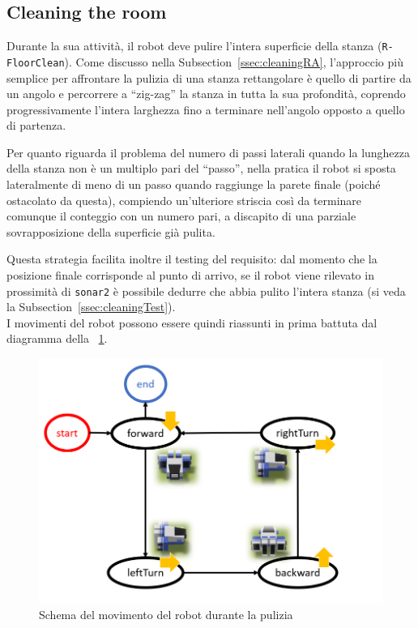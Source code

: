 \documentclass{../llncs}
\newcommand{\code}[1]{{\color{blue}\small{\texttt{#1}}}}
\newcommand{\xss}[1]{\subsectionname~\ref{ssec:#1}}
\newcommand{\labelfig}[1]{\label{fig:#1}}
\newcommand{\xf}[1]{\figurename~\ref{fig:#1}}
\newcommand{\subsectionname}{Subsection}
\begin{document}
\subsection{Cleaning the room}
Durante la sua attività, il robot deve pulire l'intera superficie della stanza (\code{R-FloorClean}). Come discusso nella \xss{cleaningRA}, l'approccio più semplice per affrontare la pulizia di una stanza rettangolare è quello di partire da un angolo e percorrere a ``zig-zag'' la stanza in tutta la sua profondità, coprendo progressivamente l'intera larghezza fino a terminare nell'angolo opposto a quello di partenza.

Per quanto riguarda il problema del numero di passi laterali quando la lunghezza della stanza non è un multiplo pari del ``passo'', nella pratica il robot si sposta lateralmente di meno di un passo quando raggiunge la parete finale (poiché ostacolato da questa), compiendo un'ulteriore striscia così da terminare comunque il conteggio con un numero pari, a discapito di una parziale sovrapposizione della superficie già pulita.

Questa strategia facilita inoltre il testing del requisito: dal momento che la posizione finale corrisponde al punto di arrivo, se il robot viene rilevato in prossimità di \code{sonar2} è possibile dedurre che abbia pulito l'intera stanza (si veda la \xss{cleaningTest}).\\

I movimenti del robot possono essere quindi riassunti in prima battuta dal diagramma della \xf{floorCleanDraft}.

\begin{figure}[!htb]
\centering
\includegraphics[scale=0.45]{img/stateDiagramCleaningDraft.png}
\caption{Schema del movimento del robot durante la pulizia}\labelfig{floorCleanDraft}
\end{figure}
\end{document}
